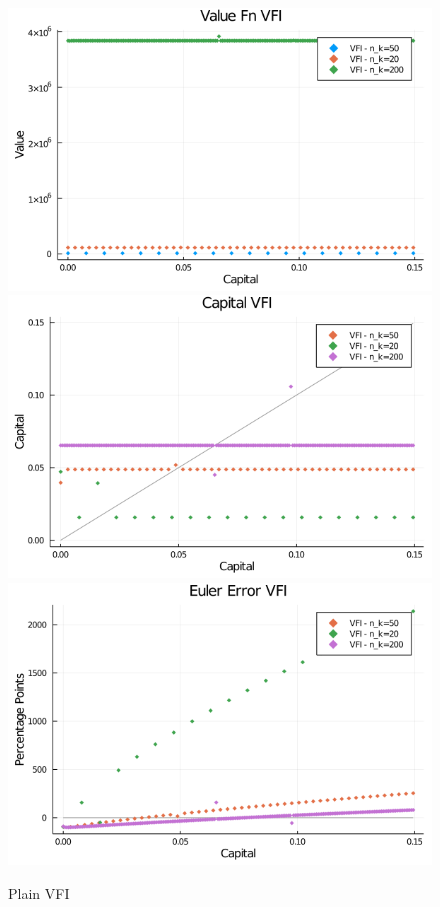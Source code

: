 \documentclass[]{article}
\begin{document}
\begin{figure}

{\centering \includegraphics[width=0.65\linewidth]{Assignment2/graphs/VFI_V} \includegraphics[width=0.65\linewidth]{Assignment2/graphs/VFI_cap} \includegraphics[width=0.65\linewidth]{Assignment2/graphs/VFI_Euler} 

}

\caption{Plain VFI}\label{fig:unnamed-chunk-2}
\end{figure}
\end{document}
